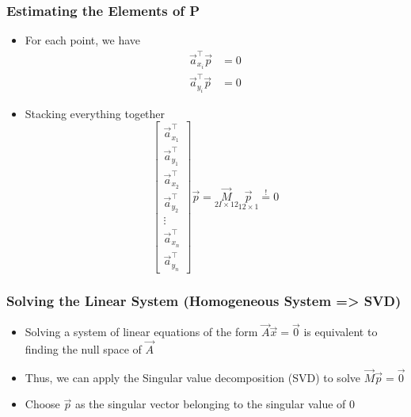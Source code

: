 \begin{frame}
\begin{center}
  \end{center}

\end{frame}


\begin{frame}
  \frametitle{Estimating the Elements of P}

  \begin{itemize}
    \item For each point, we have
    \begin{align*}
        \vec{a}_{x_i}^{\top} \vec{p} &= 0 \\
        \vec{a}_{y_i}^{\top} \vec{p} &= 0
    \end{align*}
    \item Stacking everything together
    \begin{equation*}
      \begin{bmatrix}
        \vec{a}_{x_1}^{\top} \\
        \vec{a}_{y_1}^{\top} \\
        \vec{a}_{x_2}^{\top} \\
        \vec{a}_{y_2}^{\top} \\
        \vdots \\
        \vec{a}_{x_n}^{\top} \\
        \vec{a}_{y_n}^{\top}
      \end{bmatrix} \vec{p} = \underset{2I\times 12}{\vec{M}} \underset{12\times1}{\vec{p}} \stackrel{!}{=} 0
    \end{equation*}
  \end{itemize}

\end{frame}


\begin{frame}
  \frametitle{Solving the Linear System (Homogeneous System => SVD)}
  \begin{itemize}
    \item Solving a system of linear equations of the form $\vec{A}\vec{x} = \vec{0}$ is equivalent to finding the null space of $\vec{A}$
    \item Thus, we can apply the Singular value decomposition (SVD) to solve $\vec{M}\vec{p} = \vec{0}$
    \item Choose $\vec{p}$ as the singular vector belonging to the singular value of 0
  \end{itemize}
\end{frame}

